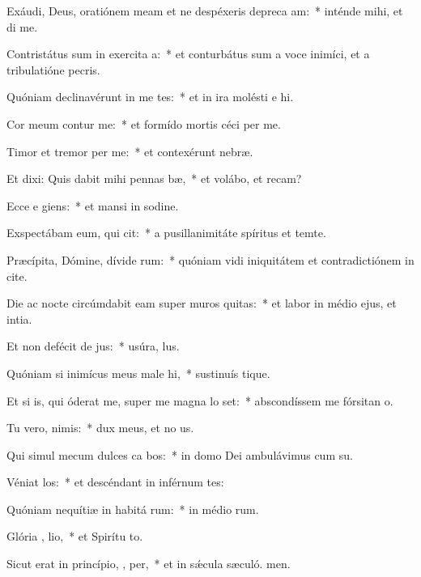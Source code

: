 \item Exáudi, Deus, oratiónem meam et ne despéxeris depreca am:~* inténde mihi, et di me.
\item Contristátus sum in exercita a:~* et conturbátus sum a voce inimíci, et a tribulatióne pecris.
\item Quóniam declinavérunt in me tes:~* et in ira molésti e hi.
\item Cor meum contur   me:~* et formído mortis céci per me.
\item Timor et tremor  per me:~* et contexérunt  nebræ.
\item Et dixi: Quis dabit mihi pennas  bæ,~* et volábo, et recam?
\item Ecce e giens:~* et mansi in sodine.
\item Exspectábam eum, qui   cit:~* a pusillanimitáte spíritus et temte.
\item Præcípita, Dómine, dívide  rum:~* quóniam vidi iniquitátem et contradictiónem in cite.
\item Die ac nocte circúmdabit eam super muros  quitas:~* et labor in médio ejus, et intia.
\item Et non defécit de  jus:~* usúra,  lus.
\item Quóniam si inimícus meus male hi,~* sustinuís tique.
\item Et si is, qui óderat me, super me magna lo set:~* abscondíssem me fórsitan  o.
\item Tu vero,  nimis:~* dux meus, et no us.
\item Qui simul mecum dulces ca bos:~* in domo Dei ambulávimus cum su.
\item Véniat   los:~* et descéndant in inférnum tes:
\item Quóniam nequítiæ in habitá rum:~* in médio rum.
\item Glória ,  lio,~* et Spirítu to.
\item Sicut erat in princípio,  ,  per,~* et in sǽcula sæculó. men.
